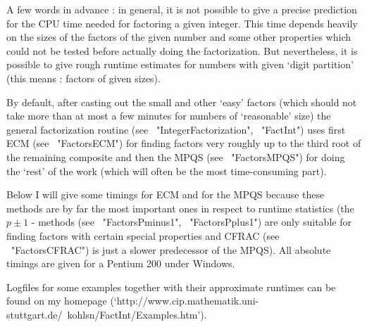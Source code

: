 


A few words in advance : in general, it is not possible to give a precise
prediction for the CPU time needed for factoring a given integer.
This time depends heavily on the sizes of the factors of the given number
and some other properties which could not be tested before actually
doing the factorization.
But nevertheless, it is possible to give rough runtime estimates for
numbers with given \lq digit partition' (this means : factors of given
sizes).

By default, after casting out the small and other \lq easy' factors
(which should not take more than at most a few minutes for numbers of
\lq reasonable' size) the general factorization routine 
(see ~"IntegerFactorization", ~"FactInt") uses first ECM
(see ~"FactorsECM") for finding factors very roughly up to the third root
of the remaining composite and then the MPQS (see ~"FactorsMPQS")
for doing the \lq rest' of the work (which will often be the most
time-consuming part).

Below I will give some timings for ECM and for the MPQS because
these methods are by far the most important ones in respect to
runtime statistics (the $p \pm 1$ - methods (see ~"FactorsPminus1",
~"FactorsPplus1") are only suitable for finding factors with certain
special properties and CFRAC (see ~"FactorsCFRAC") is just a slower
predecessor of the MPQS). All absolute timings are given for a
Pentium 200 under Windows.

Logfiles for some examples together with their approximate runtimes
can be found on my homepage 
(`http://www.cip.mathematik.uni-stuttgart.de/~kohlsn/FactInt/Examples.htm').


